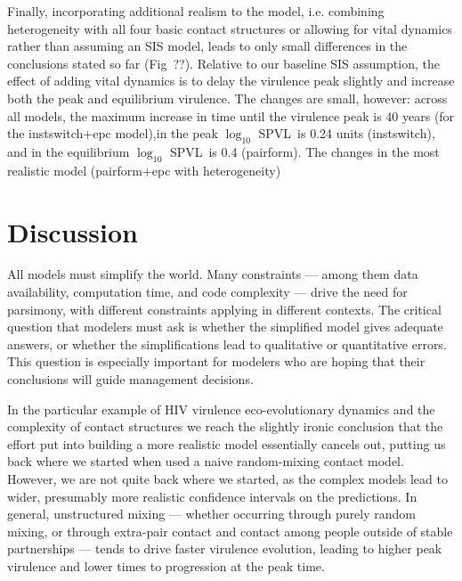 \documentclass[10pt,letterpaper]{article}
\renewcommand{\figurename}{Fig}
\newcommand{\Lspvl}{$\log_{10}$ SPVL}
\begin{document}
Finally, incorporating additional realism to the model, i.e.
combining heterogeneity with all four basic contact structures or
allowing for vital dynamics rather than assuming an SIS model,
leads to only small differences in the conclusions stated so far
(\figurename~??). Relative to our baseline SIS assumption, the
effect of adding vital dynamics is to delay the virulence peak
slightly and increase both the peak and equilibrium virulence.
The changes are small, however: across all models, the
maximum increase in time until
the virulence peak is 40 years (for the instswitch+epc model),in 
the peak \Lspvl\ is 0.24 units (instswitch), and in the equilibrium
\Lspvl\ is 0.4 (pairform). The changes in the most realistic
model (pairform+epc with heterogeneity)



\section*{Discussion}

All models must simplify the world.  Many constraints --- among them data
availability, computation time, and code complexity --- drive the need
for parsimony, with different constraints applying in different
contexts. The critical question that modelers must ask is whether the
simplified model gives adequate answers, or whether the
simplifications lead to qualitative or quantitative errors.
This question is especially important for modelers who
are hoping that their conclusions will guide management decisions.

In the particular example of HIV virulence eco-evolutionary dynamics
and the complexity of contact structures
we reach the slightly ironic conclusion that the
effort put into building a more realistic model essentially cancels
out, putting us back where we started when used a naive random-mixing
contact model.
However, we are not quite back where we started, as the
complex models lead to wider, presumably more realistic
confidence intervals on the predictions.
In general, unstructured mixing --- whether occurring through 
purely random mixing, or through extra-pair contact and contact
among people outside of stable partnerships --- tends to drive
faster virulence evolution, leading to higher peak virulence and 
lower times to progression at the peak time.
\end{document}
